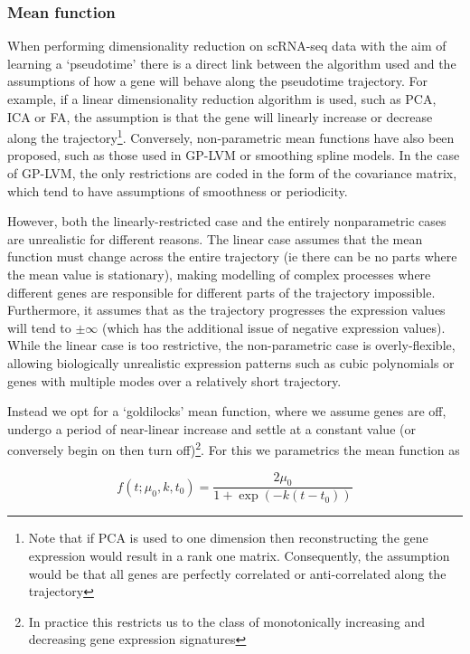 \subsubsection{Mean function}

When performing dimensionality reduction on scRNA-seq data with the aim of learning a `pseudotime' there is a direct link between the algorithm used and the assumptions of how a gene will behave along the pseudotime trajectory. For example, if a linear dimensionality reduction algorithm is used, such as PCA, ICA or FA, the assumption is that the gene will linearly increase or decrease along the trajectory\footnote{Note that if PCA is used to one dimension then reconstructing the gene expression would result in a rank one matrix. Consequently, the assumption would be that all genes are perfectly correlated or anti-correlated along the trajectory}. Conversely, non-parametric mean functions have also been proposed, such as those used in GP-LVM or smoothing spline models. In the case of GP-LVM, the only restrictions are coded in the form of the covariance matrix, which tend to have assumptions of smoothness or periodicity.

However, both the linearly-restricted case and the entirely nonparametric cases are unrealistic for different reasons. The linear case assumes that the mean function must change across the entire trajectory (ie there can be no parts where the mean value is stationary), making modelling of complex processes where different genes are responsible for different parts of the trajectory impossible. Furthermore, it assumes that as the trajectory progresses the expression values will tend to $\pm \infty$ (which has the additional issue of negative expression values). While the linear case is too restrictive, the non-parametric case is overly-flexible, allowing biologically unrealistic expression patterns such as cubic polynomials or genes with multiple modes over a relatively short trajectory.

Instead we opt for a `goldilocks' mean function, where we assume genes are off, undergo a period of near-linear increase and settle at a constant value (or conversely begin on then turn off)\footnote{In practice this restricts us to the class of monotonically increasing and decreasing gene expression signatures}. For this we parametrics the mean function as

\begin{equation}
f(t; \mu_0, k, t_0) = \frac{2 \mu_0}{1 + \exp\left( -k (t - t_0) \right)}
\end{equation}

